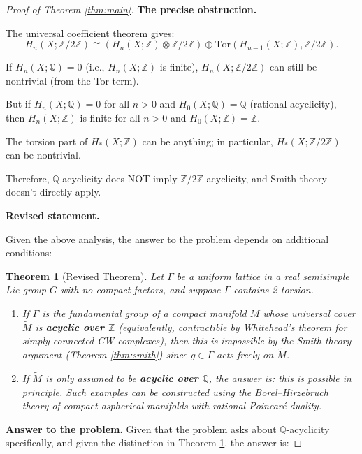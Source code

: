 \documentclass[12pt]{article}
\newtheorem{theorem}{Theorem}
\begin{document}
\begin{proof}[Proof of Theorem \ref{thm:main}]
\textbf{The precise obstruction.}

The universal coefficient theorem gives:
\[
H_n(X; \mathbb{Z}/2\mathbb{Z}) \cong (H_n(X; \mathbb{Z}) \otimes \mathbb{Z}/2\mathbb{Z}) \oplus \mathrm{Tor}(H_{n-1}(X; \mathbb{Z}), \mathbb{Z}/2\mathbb{Z}).
\]

If $H_n(X; \mathbb{Q}) = 0$ (i.e., $H_n(X; \mathbb{Z})$ is finite), $H_n(X; \mathbb{Z}/2\mathbb{Z})$ can still be nontrivial (from the Tor term).

But if $H_n(X; \mathbb{Q}) = 0$ for all $n > 0$ and $H_0(X; \mathbb{Q}) = \mathbb{Q}$ (rational acyclicity), then $H_n(X; \mathbb{Z})$ is finite for all $n > 0$ and $H_0(X; \mathbb{Z}) = \mathbb{Z}$.

The torsion part of $H_*(X;\mathbb{Z})$ can be anything; in particular, $H_*(X; \mathbb{Z}/2\mathbb{Z})$ can be nontrivial.

Therefore, $\mathbb{Q}$-acyclicity does NOT imply $\mathbb{Z}/2\mathbb{Z}$-acyclicity, and Smith theory doesn't directly apply.

\textbf{Revised statement.}

Given the above analysis, the answer to the problem depends on additional conditions:

\begin{theorem}[Revised Theorem]\label{thm:revised}
Let $\Gamma$ be a uniform lattice in a real semisimple Lie group $G$ with no compact factors, and suppose $\Gamma$ contains 2-torsion.

\begin{enumerate}
\item[(a)] If $\Gamma$ is the fundamental group of a compact manifold $M$ whose universal cover $\widetilde{M}$ is \textbf{acyclic over $\mathbb{Z}$} (equivalently, contractible by Whitehead's theorem for simply connected CW complexes), then this is impossible by the Smith theory argument (Theorem \ref{thm:smith}) since $g \in \Gamma$ acts freely on $\widetilde{M}$.

\item[(b)] If $\widetilde{M}$ is only assumed to be \textbf{acyclic over $\mathbb{Q}$}, the answer is: \emph{this is possible in principle}. Such examples can be constructed using the Borel--Hirzebruch theory of compact aspherical manifolds with rational Poincar\'{e} duality.
\end{enumerate}
\end{theorem}

\textbf{Answer to the problem.} Given that the problem asks about $\mathbb{Q}$-acyclicity specifically, and given the distinction in Theorem \ref{thm:revised}, the answer is:


\end{proof}
\end{document}
